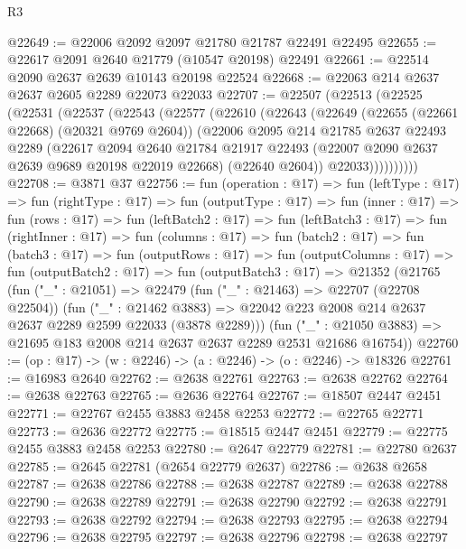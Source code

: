 \begin{lexlean}{R3}
\begin{coremodule}
@22649 := @22006 @2092 @2097 @21780 @21787 @22491 @22495
@22655 := @22617 @2091 @2640 @21779 (@10547 @20198) @22491
@22661 := @22514 @2090 @2637 @2639 @10143 @20198 @22524
@22668 := @22063 @214 @2637 @2637 @2605 @2289 @22073 @22033
@22707 := @22507
    (@22513
      (@22525
        (@22531
          (@22537
            (@22543
              (@22577
                (@22610
                  (@22643
                    (@22649
                      (@22655 (@22661 @22668) (@20321 @9769 @2604))
                      (@22006
                        @2095
                        @214
                        @21785
                        @2637
                        @22493
                        @2289
                        (@22617
                          @2094
                          @2640
                          @21784
                          @21917
                          @22493
                          (@22007 @2090 @2637 @2639 @9689 @20198 @22019 @22668)
                          (@22640 @2604))
                        @22033))))))))))
@22708 := @3871 @37
@22756 := fun (operation : @17) =>
  fun (leftType : @17) =>
  fun (rightType : @17) =>
  fun (outputType : @17) =>
  fun (inner : @17) =>
  fun (rows : @17) =>
  fun (leftBatch2 : @17) =>
  fun (leftBatch3 : @17) =>
  fun (rightInner : @17) =>
  fun (columns : @17) =>
  fun (batch2 : @17) =>
  fun (batch3 : @17) =>
  fun (outputRows : @17) =>
  fun (outputColumns : @17) =>
  fun (outputBatch2 : @17) =>
  fun (outputBatch3 : @17) =>
  @21352
    (@21765
      (fun ("_" : @21051) =>
      @22479
        (fun ("_" : @21463) => @22707 (@22708 @22504))
        (fun ("_" : @21462 @3883) =>
        @22042 @223 @2008 @214 @2637 @2637 @2289 @2599 @22033 (@3878 @2289)))
      (fun ("_" : @21050 @3883) => @21695 @183 @2008 @214 @2637 @2637 @2289 @2531 @21686 @16754))
@22760 := (op : @17) -> (w : @2246) -> (a : @2246) -> (o : @2246) -> @18326
@22761 := @16983 @2640
@22762 := @2638 @22761
@22763 := @2638 @22762
@22764 := @2638 @22763
@22765 := @2636 @22764
@22767 := @18507 @2447 @2451
@22771 := @22767 @2455 @3883 @2458 @2253
@22772 := @22765 @22771
@22773 := @2636 @22772
@22775 := @18515 @2447 @2451
@22779 := @22775 @2455 @3883 @2458 @2253
@22780 := @2647 @22779
@22781 := @22780 @2637
@22785 := @2645 @22781 (@2654 @22779 @2637)
@22786 := @2638 @2658
@22787 := @2638 @22786
@22788 := @2638 @22787
@22789 := @2638 @22788
@22790 := @2638 @22789
@22791 := @2638 @22790
@22792 := @2638 @22791
@22793 := @2638 @22792
@22794 := @2638 @22793
@22795 := @2638 @22794
@22796 := @2638 @22795
@22797 := @2638 @22796
@22798 := @2638 @22797

\end{coremodule}
\end{lexlean}
